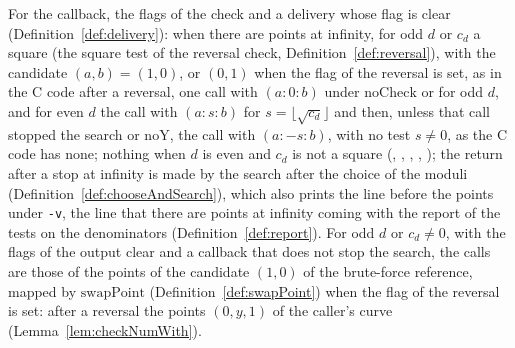 \begin{definition}\label{def:pointsAtInfinity}
  \leanok
  For the callback, the flags of the check and a delivery whose flag is clear
  (Definition~\ref{def:delivery}): when there are points at infinity, for odd $d$ or $c_d$ a square
  (the square test of the reversal check, Definition~\ref{def:reversal}), with the candidate
  $(a, b) = (1, 0)$, or $(0, 1)$ when the flag of the reversal is set, as in the C code after a
  reversal, one call with $(a : 0 : b)$ under $\mathrm{noCheck}$ or for odd $d$, and for even $d$
  the call with $(a : s : b)$ for $s = \lfloor \sqrt{c_d} \rfloor$ and then, unless that call
  stopped the search or $\mathrm{noY}$, the call with $(a : -s : b)$, with no test $s \ne 0$, as the
  C code has none; nothing when $d$ is even and $c_d$ is not a square
  (, ,
  , ,
  ); the return after a stop at infinity is made by the search
  after the choice of the moduli (Definition~\ref{def:chooseAndSearch}), which also prints the line
  before the points under \verb|-v|, the line that there are points at infinity coming with the
  report of the tests on the denominators (Definition~\ref{def:report}). For odd $d$ or $c_d \ne 0$,
  with the flags of the output clear and a callback that does not stop the search, the calls are
  those of the points of the candidate $(1, 0)$ of the brute-force reference, mapped by
  $\mathrm{swapPoint}$ (Definition~\ref{def:swapPoint}) when the flag of the reversal is set: after
  a reversal the points $(0, y, 1)$ of the caller's curve (Lemma~\ref{lem:checkNumWith}).
\end{definition}

